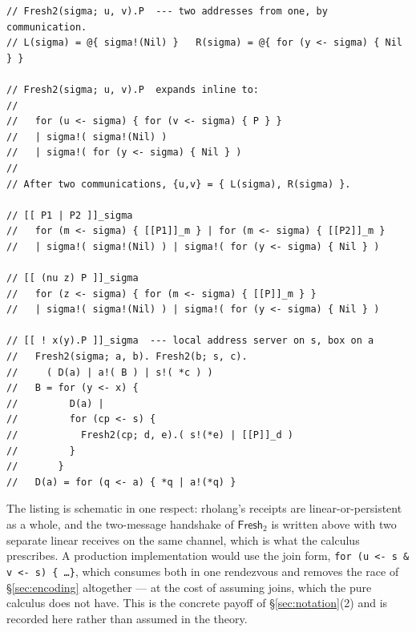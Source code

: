 \documentclass[11pt]{article}
\theoremstyle{definition}
\theoremstyle{plain}
\theoremstyle{remark}
\newcommand{\Frsh}{\mathsf{Fresh}_2}
\begin{document}
\begin{lstlisting}
// Fresh2(sigma; u, v).P  --- two addresses from one, by communication.
// L(sigma) = @{ sigma!(Nil) }   R(sigma) = @{ for (y <- sigma) { Nil } }

// Fresh2(sigma; u, v).P  expands inline to:
//
//   for (u <- sigma) { for (v <- sigma) { P } }
//   | sigma!( sigma!(Nil) )
//   | sigma!( for (y <- sigma) { Nil } )
//
// After two communications, {u,v} = { L(sigma), R(sigma) }.

// [[ P1 | P2 ]]_sigma
//   for (m <- sigma) { [[P1]]_m } | for (m <- sigma) { [[P2]]_m }
//   | sigma!( sigma!(Nil) ) | sigma!( for (y <- sigma) { Nil } )

// [[ (nu z) P ]]_sigma
//   for (z <- sigma) { for (m <- sigma) { [[P]]_m } }
//   | sigma!( sigma!(Nil) ) | sigma!( for (y <- sigma) { Nil } )

// [[ ! x(y).P ]]_sigma  --- local address server on s, box on a
//   Fresh2(sigma; a, b). Fresh2(b; s, c).
//     ( D(a) | a!( B ) | s!( *c ) )
//   B = for (y <- x) {
//         D(a) |
//         for (cp <- s) {
//           Fresh2(cp; d, e).( s!(*e) | [[P]]_d )
//         }
//       }
//   D(a) = for (q <- a) { *q | a!(*q) }
\end{lstlisting}

\noindent
The listing is schematic in one respect: rholang's receipts are
linear-or-persistent as a whole, and the two-message handshake of
$\Frsh$ is written above with two separate linear receives on the same
channel, which is what the calculus prescribes. A production
implementation would use the join form,
\texttt{for (u <- s \& v <- s) \{ \ldots \}}, which consumes both in one
rendezvous and removes the race of \S\ref{sec:encoding} altogether --- at
the cost of assuming joins, which the pure calculus does not have. This
is the concrete payoff of \S\ref{sec:notation}(2) and is recorded here
rather than assumed in the theory.
\end{document}
